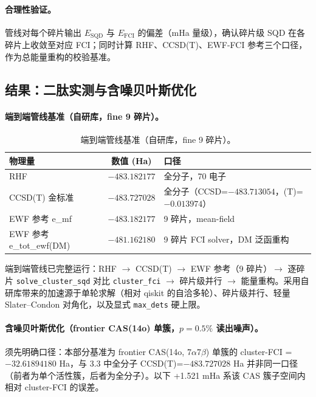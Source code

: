 \documentclass[UTF8,12pt,a4paper]{ctexart}
\begin{document}
\paragraph{合理性验证。} 管线对每个碎片输出 $E_{\text{SQD}}$ 与 $E_{\text{FCI}}$ 的偏差（mHa 量级），确认碎片级 SQD 在各碎片上收敛至对应 FCI；同时计算 RHF、CCSD(T)、EWF-FCI 参考三个口径，作为总能量重构的校验基准。

\subsection{结果：二肽实测与含噪贝叶斯优化}

\paragraph{端到端管线基准（自研库，fine 9 碎片）。}

\begin{table}[H]
\centering
\caption{端到端管线基准（自研库，fine 9 碎片）。}
\begin{tabular}{lcp{6.5cm}}
\toprule
物理量 & 数值 (Ha) & 口径 \\
\midrule
RHF & $-483.182177$ & 全分子，70 电子 \\
CCSD(T) 金标准 & $-483.727028$ & 全分子（CCSD=$-483.713054$，(T)=$-0.013974$） \\
EWF 参考 e\_mf & $-483.182177$ & 9 碎片，mean-field \\
EWF 参考 e\_tot\_ewf(DM) & $-481.162180$ & 9 碎片 FCI solver，DM 泛函重构 \\
\bottomrule
\end{tabular}
\end{table}

端到端管线已完整运行：RHF $\rightarrow$ CCSD(T) $\rightarrow$ EWF 参考（9 碎片）$\rightarrow$ 逐碎片 \texttt{solve\_cluster\_sqd} 对比 \texttt{cluster\_fci} $\rightarrow$ 碎片级并行 $\rightarrow$ 能量重构。采用自研库带来的加速源于单轮求解（相对 qiskit 的自洽多轮）、碎片级并行、轻量 Slater--Condon 对角化，以及显式 \texttt{max\_dets} 硬上限。

\paragraph{含噪贝叶斯优化（frontier CAS(14o) 单簇，$p=0.5\%$ 读出噪声）。} 须先明确口径：本部分基准为 frontier CAS(14o, 7$\alpha$7$\beta$) 单簇的 cluster-FCI = $-32.61894180$ Ha，与 3.3 中全分子 CCSD(T)=$-483.727028$ Ha 并非同一口径（前者为单个活性簇，后者为全分子）。以下 +1.521 mHa 系该 CAS 簇子空间内相对 cluster-FCI 的误差。
\end{document}
